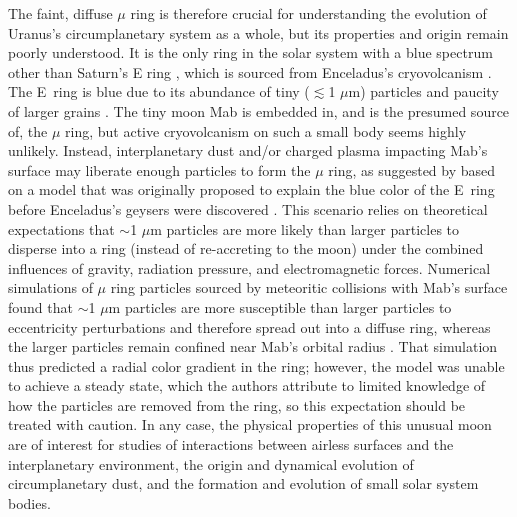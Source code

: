 \documentclass[preprint]{aastex631}
\begin{document}
The faint, diffuse $\mu$ ring is therefore crucial for understanding the evolution of Uranus's circumplanetary system as a whole, but its properties and origin remain poorly understood.
It is the only ring in the solar system with a blue spectrum other than Saturn's E ring \citep{depater06}, which is sourced from Enceladus's cryovolcanism \textbf{\citep{pang84, porco06, spencer06, spahn06}}. The E~ring is blue due to its abundance of tiny ($\lesssim$1 $\mu$m) particles and paucity of larger grains \citep{showalter91, depater04, hillier07}. The tiny moon Mab is embedded in, and is the presumed source of, the $\mu$ ring, but active cryovolcanism on such a small body seems highly unlikely. Instead, interplanetary dust and/or charged plasma impacting Mab's surface may liberate enough particles to form the $\mu$ ring, as suggested by \citet{depater06} based on a model that was originally proposed to explain the blue color of the E~ring before Enceladus's geysers were discovered \citep{horanyi92, hamilton94}. This scenario relies on theoretical expectations that $\sim$1 $\mu$m particles are more likely than larger particles to disperse into a ring (instead of re-accreting to the moon) under the combined influences of gravity, radiation pressure, and electromagnetic forces.  Numerical simulations of $\mu$ ring particles sourced by meteoritic collisions with Mab's surface found that $\sim$1 $\mu$m particles are more susceptible than larger particles to eccentricity perturbations and therefore spread out into a diffuse ring, whereas the larger particles remain confined near Mab's orbital radius \citep{sfair12}. That simulation thus predicted a radial color gradient in the ring; however, the model was unable to achieve a steady state, which the authors attribute to limited knowledge of how the particles are removed from the ring, so this expectation should be treated with caution.
In any case, the physical properties of this unusual moon are of interest for studies of interactions between airless surfaces and the interplanetary environment, the origin and dynamical evolution of circumplanetary dust, and the formation and evolution of small solar system bodies.
\end{document}
